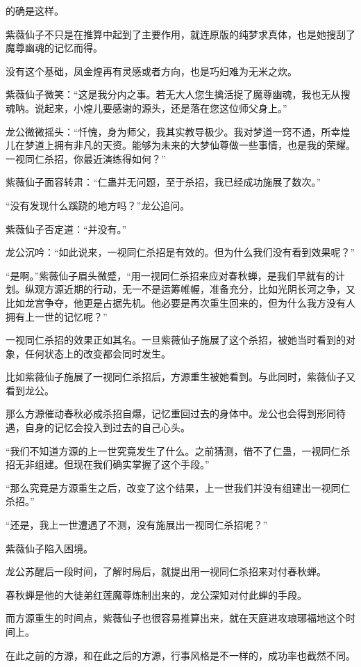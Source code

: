 \begin{this_body}
的确是这样。

紫薇仙子不只是在推算中起到了主要作用，就连原版的纯梦求真体，也是她搜刮了魔尊幽魂的记忆而得。

没有这个基础，凤金煌再有灵感或者方向，也是巧妇难为无米之炊。

紫薇仙子微笑：“这是我分内之事。若无大人您生擒活捉了魔尊幽魂，我也无从搜魂呐。说起来，小煌儿要感谢的源头，还是落在您这位师父身上。”

龙公微微摇头：“忏愧，身为师父，我其实教导极少。我对梦道一窍不通，所幸煌儿在梦道上拥有非凡的天资。能够为未来的大梦仙尊做一些事情，也是我的荣耀。一视同仁杀招，你最近演练得如何？”

紫薇仙子面容转肃：“仁蛊并无问题，至于杀招，我已经成功施展了数次。”

“没有发现什么蹊跷的地方吗？”龙公追问。

紫薇仙子否定道：“并没有。”

龙公沉吟：“如此说来，一视同仁杀招是有效的。但为什么我们没有看到效果呢？”

“是啊。”紫薇仙子眉头微蹙，“用一视同仁杀招来应对春秋蝉，是我们早就有的计划。纵观方源近期的行动，无一不是运筹帷幄，准备充分，比如光阴长河之争，又比如龙宫争夺，他更是占据先机。他必要是再次重生回来的，但为什么我方没有人拥有上一世的记忆呢？”

一视同仁杀招的效果正如其名。一旦紫薇仙子施展了这个杀招，被她当时看到的对象，任何状态上的改变都会同时发生。

比如紫薇仙子施展了一视同仁杀招后，方源重生被她看到。与此同时，紫薇仙子又看到龙公。

那么方源催动春秋必成杀招自爆，记忆重回过去的身体中。龙公也会得到形同待遇，自身的记忆会投入到过去的自己心头。

“我们不知道方源的上一世究竟发生了什么。之前猜测，借不了仁蛊，一视同仁杀招无非组建。但现在我们确实掌握了这个手段。”

“那么究竟是方源重生之后，改变了这个结果，上一世我们并没有组建出一视同仁杀招。”

“还是，我上一世遭遇了不测，没有施展出一视同仁杀招呢？”

紫薇仙子陷入困境。

龙公苏醒后一段时间，了解时局后，就提出用一视同仁杀招来对付春秋蝉。

春秋蝉是他的大徒弟红莲魔尊炼制出来的，龙公深知对付此蝉的手段。

而方源重生的时间点，紫薇仙子也很容易推算出来，就在天庭进攻琅琊福地这个时间上。

在此之前的方源，和在此之后的方源，行事风格是不一样的，成功率也截然不同。


\end{this_body}
